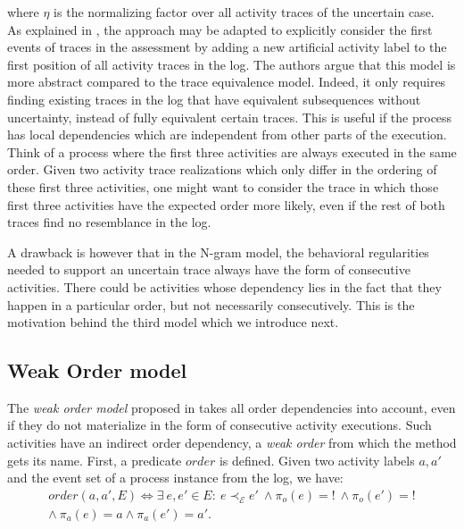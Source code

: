 where $\eta$ is the normalizing factor over all activity traces of the uncertain case.\\
As explained in \cite{por}, the approach may be adapted to explicitly consider the first events of traces in the assessment by adding a new artificial activity label to the first position of all activity traces in the log.
The authors argue that this model is more abstract compared to the trace equivalence model.
Indeed, it only requires finding existing traces in the log that have equivalent subsequences without uncertainty, instead of fully equivalent certain traces.
This is useful if the process has local dependencies which are independent from other parts of the execution.
Think of a process where the first three activities are always executed in the same order.
Given two activity trace realizations which only differ in the ordering of these first three activities, one might want to consider the trace in which those first three activities have the expected order more likely, even if the rest of both traces find no resemblance in the log.

A drawback is however that in the N-gram model, the behavioral regularities needed to support an uncertain trace always have the form of consecutive activities.
There could be activities whose dependency lies in the fact that they happen in a particular order, but not necessarily consecutively.
This is the motivation behind the third model which we introduce next.



\subsection{Weak Order model}
The \textit{weak order model} proposed in \cite{por} takes all order dependencies into account, even if they do not materialize in the form of consecutive activity executions.
Such activities have an indirect order dependency, a \textit{weak order} from which the method gets its name.
First, a predicate $order$ is defined.
Given two activity labels $a,a'$ and the event set of a process instance from the log, we have:
\begin{align*}
order(a,a',E) \Leftrightarrow 
\exists ~e, e' \in E: ~ e \prec_{\mathcal{E}} e' ~ \wedge \pi_o(e)=! ~ \wedge \pi_o(e')=! \\
\wedge ~ \pi_a(e)=a \wedge \pi_a(e')=a'.
\end{align*}

